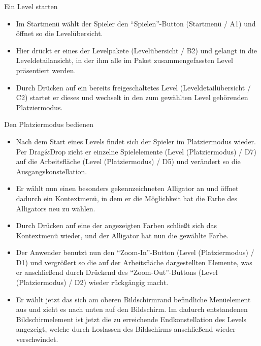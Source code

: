 \begin{requirements}
\begin{itemize}
	\end{itemize}
	

	 Ein Level starten
	
	
	\begin{itemize}
  			\item Im Startmenü wählt der Spieler den "`Spielen"'-Button (Startmenü / A1) und öffnet so die Levelübersicht.
  			
  			\item Hier drückt er eines der Levelpakete (Levelübersicht / B2) und gelangt in die Leveldetailansicht, in der ihm alle im Paket zusammengefassten Level präsentiert werden.
  			
  			\item Durch Drücken auf ein bereits freigeschaltetes Level (Leveldetailübersicht / C2) startet er dieses und wechselt in den zum gewählten Level gehörenden Platziermodus.
  	\end{itemize}
  	
  	
  	
  	 Den Platziermodus bedienen
  	
	
	\begin{itemize}
			\item Nach dem Start eines Levels findet sich der Spieler im Platziermodus wieder. Per Drag\&Drop zieht er einzelne Spielelemente (Level (Platziermodus) / D7) auf die Arbeitsfläche (Level (Platziermodus) / D5) und verändert so die Ausgangskonstellation.
  			
  			\item Er wählt nun einen besonders gekennzeichneten Alligator an und öffnet dadurch ein Kontextmenü, in dem er die Möglichkeit hat die Farbe des Alligators neu zu wählen.
  			
  			\item Durch Drücken auf eine der angezeigten Farben schließt sich das Kontextmenü wieder, und der Alligator hat nun die gewählte Farbe.
  			
  			\item Der Anwender benutzt nun den "`Zoom-In"'-Button (Level (Platziermodus) / D1) und vergrößert so die auf der Arbeitsfläche dargestellten Elemente, was er anschließend durch Drückend des "`Zoom-Out"'-Buttons  (Level (Platziermodus) / D2) wieder rückgängig macht.
  			
  			\item Er wählt jetzt das sich am oberen Bildschirmrand befindliche Menüelement aus und zieht es nach unten auf den Bildschirm. Im dadurch entstandenen Bildschirmelement ist jetzt die zu erreichende Endkonstellation des Levels angezeigt, welche durch Loslassen des Bildschirms anschließend wieder verschwindet. 
  			

\end{itemize}
\end{requirements}
